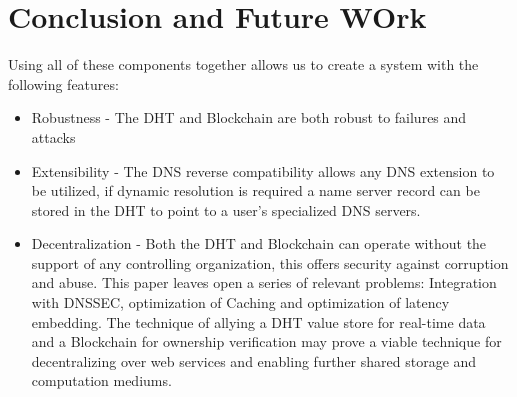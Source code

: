 \documentclass[11pt]{IEEEtran} %
\begin{document}
\section{Conclusion and Future WOrk}
Using all of these components together allows us to create a system with the following features:
\begin{itemize}
	\item Robustness - The DHT and Blockchain are both robust to failures and attacks
	\item Extensibility - The DNS reverse compatibility allows any DNS extension to be utilized, if dynamic resolution is required a name server record can be stored in the DHT to point to a user's specialized DNS servers.
	\item Decentralization - Both the DHT and Blockchain can operate without the support of any controlling organization, this offers security against corruption and abuse.
This paper leaves open a series of relevant problems: Integration with DNSSEC, optimization of Caching and optimization of latency embedding. The technique of allying a DHT value store for real-time data and a Blockchain for ownership verification may prove a viable technique for decentralizing over web services and enabling further shared storage and computation mediums.

\end{itemize}	



\end{document}
